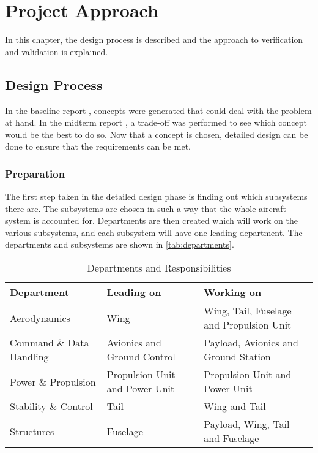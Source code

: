 \chapter{Project Approach}
\setlength{\parindent}{15pt}
\label{ch:proj_appr}
In this chapter, the design process is described and the approach to verification and validation is explained.

\section{Design Process}
\label{sec:desi_proc}

In the baseline report \cite{baseline}, concepts were generated that could deal with the problem at hand. In the midterm report \cite{midterm}, a trade-off was performed to see which concept would be the best to do so. Now that a concept is chosen, detailed design can be done to ensure that the requirements can be met. 

\subsection{Preparation}

The first step taken in the detailed design phase is finding out which subsystems there are. The subsystems are chosen in such a way that the whole aircraft system is accounted for. Departments are then created which will work on the various subsystems, and each subsystem will have one leading department. The departments and subsystems are shown in \autoref{tab:departments}.


\begin{table}[H]
    \centering
    \caption{Departments and Responsibilities}
    \label{tab:departments}
    \begin{tabularx}{\textwidth}{LLL} 
    \toprule
    \bfseries Department     & \bfseries Leading on & \bfseries Working on
    \\ \midrule
    Aerodynamics     & Wing & Wing, Tail, Fuselage and Propulsion Unit 
    \\ \hdashline
    Command \& Data Handling & Avionics and Ground Control & Payload, Avionics and Ground Station 
    \\ \hdashline
    Power \& Propulsion & Propulsion Unit and Power Unit & Propulsion Unit and Power Unit 
    \\ \hdashline
    Stability \& Control & Tail & Wing and Tail 
    \\ \hdashline
    Structures & Fuselage & Payload, Wing, Tail and Fuselage 
    \\ \bottomrule
    \end{tabularx}
\end{table}

